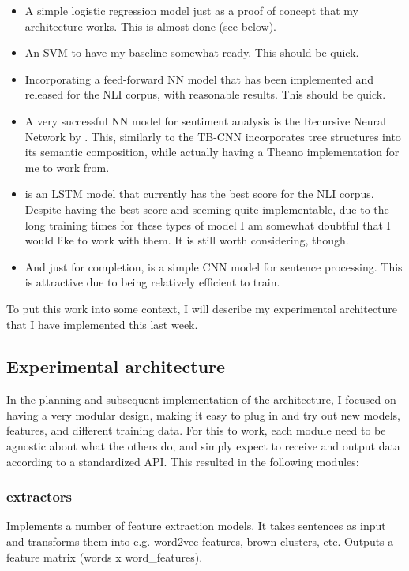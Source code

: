 \begin{itemize}
	\item A simple logistic regression model just as a proof of concept that my architecture works. This is almost done (see below).
	\item An SVM to have my baseline somewhat ready. This should be quick.
	\item Incorporating a feed-forward NN model that has been implemented and released for the NLI corpus, with reasonable results. This should be quick.
	\item A very successful NN model for sentiment analysis is the Recursive Neural Network by \cite{socher2013recursive}. This, similarly to the TB-CNN incorporates tree structures into its semantic composition, while actually having a Theano implementation for me to work from.
	\item \cite{cheng_long_2016} is an LSTM model that currently has the best score for the NLI corpus. Despite having the best score and seeming quite implementable, due to the long training times for these types of model I am somewhat doubtful that I would like to work with them. It is still worth considering, though.
	\item And just for completion, \cite{kim_convolutional_2014} is a simple CNN model for sentence processing. This is attractive due to being relatively efficient to train.
\end{itemize}

To put this work into some context, I will describe my experimental architecture that I have implemented this last week.

\subsection{Experimental architecture}

In the planning and subsequent implementation of the architecture, I focused on having a very modular design, making it easy to plug in and try out new models, features, and different training data. For this to work, each module need to be agnostic about what the others do, and simply expect to receive and output data according to a standardized API. This resulted in the following modules:

\subsubsection{extractors} Implements a number of feature extraction models. It takes sentences as input and transforms them into e.g. word2vec features, brown clusters, etc. Outputs a feature matrix (words x word\_features).

